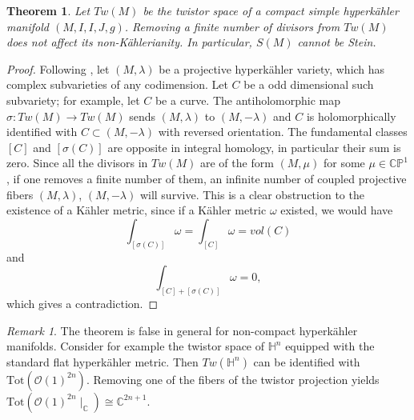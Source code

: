 \documentclass[11pt]{amsart}
\theoremstyle{definition}
\theoremstyle{plain}
\newtheorem{Teorema}[Def]{Theorem}
\theoremstyle{definition}
\theoremstyle{plain}
\theoremstyle{remark}
\newtheorem{rmk}[Def]{Remark}
\theoremstyle{plain}
\newcommand{\numberset}{\mathbb}
\newcommand{\C}{\numberset{C}}
\newcommand{\proj}{\mathbb{P}}
\begin{document}
\begin{Teorema} \label{Th4.1}  Let $Tw(M)$  be the twistor space of a compact simple hyperk\"ahler manifold
$(M,I,I,J,g)$.
    Removing a finite  number of divisors from $Tw(M)$  does not affect its non-K\"ahlerianity. In particular, $S(M)$ cannot be Stein.
\end{Teorema}
\begin{proof}
    Following \cite{Verbitsky}, 
let $(M, \lambda)$ be a projective hyperk\"ahler variety, which has  complex subvarieties of any codimension. Let $C$ be a odd dimensional such subvariety; for example, let $C$ be a curve. The antiholomorphic map $\sigma:  Tw(M) \to Tw(M)$ sends $(M, \lambda)$ to $(M, -\lambda)$ and $C$ is holomorphically identified with $C\subset (M, -\lambda) $ with reversed orientation. The fundamental classes $[C]$   and $[\sigma(C)]$ are opposite in integral homology, in particular their sum is zero. Since all the divisors in $Tw(M)$ are of the form $(M,\mu)$ for some $\mu \in \C \proj^1$, if one removes a finite number of them, an infinite  number of coupled projective fibers $(M,\lambda)$, $(M,-\lambda)$ will survive. This is a clear obstruction to the existence of a K\"ahler metric, since if a K\"ahler metric $\omega$ existed,   we would have  $$\int_{[\sigma(C)]}\omega=\int_{[C]} \omega=vol(C)$$ and $$\int_{[C]+[\sigma (C)]} \omega=0,
    $$
    which gives a contradiction.
    
\end{proof}
 \begin{rmk}
     The theorem is false in general for non-compact hyperk\"ahler manifolds. Consider for example the twistor space of $\mathbb{H}^n$ equipped with the standard flat hyperk\"ahler metric. Then $Tw(\mathbb{H}^n)$ can be identified with  $\text{Tot}(\mathcal{O}(1)^{2n})$. Removing one of the fibers of the twistor projection yields $\text{Tot}(\mathcal{O}(1)^{2n}\mid_{\C}) \cong  \C^{2n+1}  $.
 \end{rmk}
\end{document}
